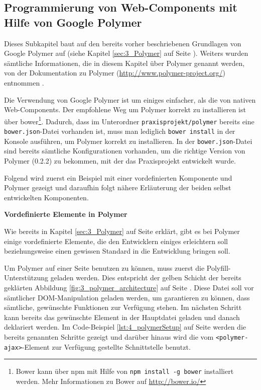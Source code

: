 \subsection{Programmierung von Web-Components mit Hilfe von Google Polymer}
\label{sec:4_WC_Polymer}

Dieses Subkapitel baut auf den bereits vorher beschriebenen Grundlagen von Google Polymer auf (siehe Kapitel \ref{sec:3_Polymer} auf Seite \pageref{sec:3_Polymer}). Weiters wurden sämtliche Informationen, die in diesem Kapitel über Polymer genannt werden, von der Dokumentation zu Polymer (\url{http://www.polymer-project.org/}) entnommen \citereset \autocite[siehe][]{Polymer}.

Die Verwendung von Google Polymer ist um einiges einfacher, als die von nativen Web-Components. Der empfohlene Weg um Polymer korrekt zu installieren ist über \glqq bower\footnote{Bower kann über npm mit Hilfe von \lstinline|npm install -g bower| installiert werden. Mehr Informationen zu Bower auf \href{http://bower.io/}{http://bower.io/}}\grqq . Dadurch, dass im Unterordner \lstinline|praxisprojekt/polymer| bereits eine \lstinline|bower.json|-Datei vorhanden ist, muss man lediglich \lstinline|bower install| in der Konsole ausführen, um Polymer korrekt zu installieren. In der \lstinline|bower.json|-Datei sind bereits sämtliche Konfigurationen vorhanden, um die richtige Version von Polymer (0.2.2) zu bekommen, mit der das Praxisprojekt entwickelt wurde.

Folgend wird zuerst ein Beispiel mit einer vordefinierten Komponente und Polymer gezeigt und daraufhin folgt nähere Erläuterung der beiden selbst entwickelten Komponenten.

\textbf{Vordefinierte Elemente in Polymer}

Wie bereits in Kapitel \ref{sec:3_Polymer} auf Seite \pageref{sec:3_Polymer} erklärt, gibt es bei Polymer einige vordefinierte Elemente, die den Entwicklern einiges erleichtern soll beziehungsweise einen gewissen Standard in die Entwicklung bringen soll.

Um Polymer auf einer Seite benutzen zu können, muss zuerst die Polyfill-Unterstützung geladen werden. Dies entspricht der gelben Schicht der bereits geklärten Abbildung \ref{fig:3_polymer_architecture} auf Seite \pageref{fig:3_polymer_architecture}.
Diese Datei soll vor sämtlicher DOM-Manipulation geladen werden, um garantieren zu können, dass sämtliche, gewünschte Funktionen zur Verfügung stehen. Im nächsten Schritt kann bereits das gewünschte Element in der Hauptdatei geladen und danach deklariert werden. Im Code-Beispiel \ref{lst:4_polymerSetup} auf Seite \pageref{lst:4_polymerSetup} werden die bereits genannten Schritte gezeigt und darüber hinaus wird die vom \lstinline|<polymer-ajax>|-Element zur Verfügung gestellte Schnittstelle benutzt.

